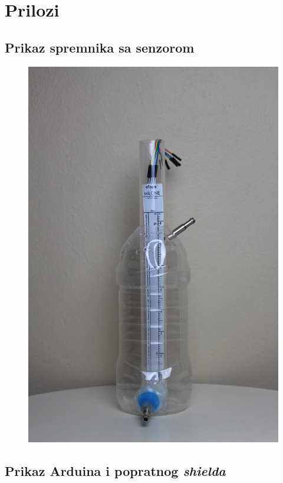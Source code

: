 \chapter*{Prilozi}

\section*{Prikaz spremnika sa senzorom}

\begin{figure}[h]
\centering
\includegraphics[angle=-90, scale=0.4]{figures/tank_picture_resized.jpeg}
\end{figure}

\newpage
\section*{Prikaz Arduina i popratnog \emph{shielda}}

